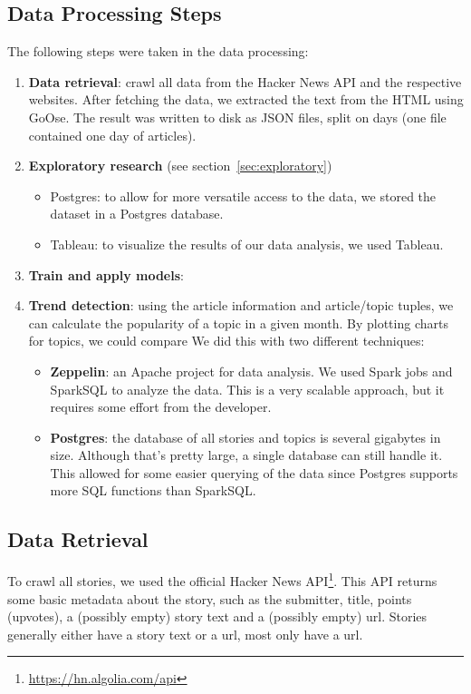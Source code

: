 \subsection{Data Processing Steps}
The following steps were taken in the data processing:
\begin{enumerate}
	\item \textbf{Data retrieval}: crawl all data from the Hacker News API and the respective websites. After fetching the data, we extracted the text from the HTML using GoOse. The result was written to disk as JSON files, split on days (one file contained one day of articles).
	\item \textbf{Exploratory research} (see section~\ref{sec:exploratory})
		\begin{itemize}
			\item Postgres: to allow for more versatile access to the data, we stored the dataset in a Postgres database.
			\item Tableau: to visualize the results of our data analysis, we used Tableau.
		\end{itemize}
	\item \textbf{Train and apply models}: 

	\item \textbf{Trend detection}: using the article information and article/topic tuples, we can calculate the popularity of a topic in a given month. By plotting charts for topics, we could compare We did this with two different techniques:
		\begin{itemize}
			\item \textbf{Zeppelin}: an Apache project for data analysis. We used Spark jobs and SparkSQL to analyze the data. This is a very scalable approach, but it requires some effort from the developer.
			\item \textbf{Postgres}: the database of all stories and topics is several gigabytes in size. Although that's pretty large, a single database can still handle it. This allowed for some easier querying of the data since Postgres supports more SQL functions than SparkSQL.
		\end{itemize}
\end{enumerate}

\subsection{Data Retrieval}
To crawl all stories, we used the official Hacker News API\footnote{\url{https://hn.algolia.com/api}}. This API returns some basic metadata about the story, such as the submitter, title, points (upvotes), a (possibly empty) story text and a (possibly empty) url. Stories generally either have a story text or a url, most only have a url.

